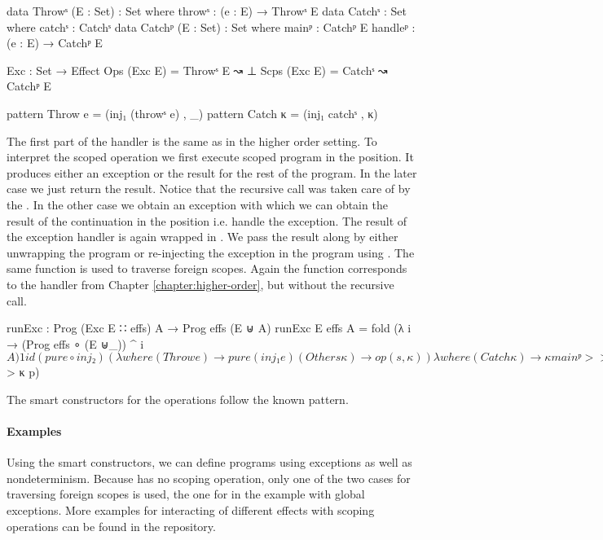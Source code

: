 \begin{code}
data Throwˢ (E : Set)  : Set where throwˢ : (e : E) → Throwˢ E
data Catchˢ            : Set where catchˢ : Catchˢ
data Catchᵖ (E : Set)  : Set where
  mainᵖ    : Catchᵖ E
  handleᵖ  : (e : E) → Catchᵖ E

Exc : Set → Effect
Ops   (Exc E) = Throwˢ E  ↝ ⊥
Scps  (Exc E) = Catchˢ    ↝ Catchᵖ E

pattern Throw  e = (inj₁ (throwˢ e) , _)
pattern Catch  κ = (inj₁ catchˢ , κ)
\end{code}
The first part of the handler is the same as in the higher order setting.
To interpret the scoped operation  we first execute scoped
program in the  position.
It produces either an exception or the result for the rest of the program.
In the later case we just return the result.
Notice that the recursive call was taken care of by the .
In the other case we obtain an exception  with which we can
obtain the result of the continuation in the 
position i.e. handle the exception.
The result of the exception handler is again wrapped in .
We pass the result along by either unwrapping the program or re-injecting the
exception in the program using .
The same function is used to traverse foreign scopes.
Again the function corresponds to the handler from Chapter
\ref{chapter:higher-order}, but without the recursive call.

\begin{code}
runExc : Prog (Exc E ∷ effs) A → Prog effs (E ⊎ A)
runExc {E} {effs} {A} = fold (λ i → (Prog effs ∘ (E ⊎_)) ^ i $ A) 1 id
  (pure ∘ inj₂)
  ( λ where
    (Throw e)    → pure (inj₁ e)
    (Other s κ)  → op (s , κ)
  ) λ where
    (Catch κ) → κ mainᵖ >>= λ where
      (inj₁ e)  → κ (handleᵖ e) >>= [ pure ∘ inj₁ , id ]
      (inj₂ x)  → x
    (Other s κ) → scp (s , λ p → [ pure ∘ inj₁ , id ] <$> κ p)
\end{code}
The smart constructors for the operations follow the known pattern.

\paragraph{Examples}
Using the smart constructors, we can define programs using exceptions as well as
nondeterminism.
Because  has no scoping operation, only one of the two
cases for traversing foreign scopes is used, the one for 
in the example with global exceptions.
More examples for interacting of different effects with scoping operations can
be found in the repository.

